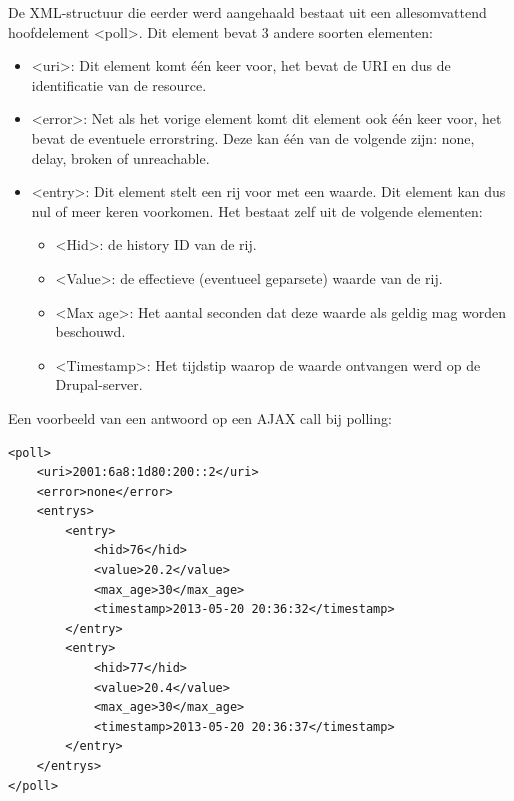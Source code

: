 De XML-structuur die eerder werd aangehaald bestaat uit een allesomvattend hoofdelement \textless poll\textgreater. Dit element bevat 3 andere soorten elementen:
\begin{itemize}
\item \textless uri\textgreater: Dit element komt \'{e}\'{e}n keer voor, het bevat de URI en dus de identificatie van de resource.
\item \textless error\textgreater: Net als het vorige element komt dit element ook \'{e}\'{e}n keer voor, het bevat de eventuele errorstring. Deze kan \'{e}\'{e}n van de volgende zijn: none, delay, broken of unreachable.
\item \textless entry\textgreater: Dit element stelt een rij voor met een waarde. Dit element kan dus nul of meer keren voorkomen. Het bestaat zelf uit de volgende elementen:
\begin{itemize}
\item \textless Hid\textgreater: de history ID van de rij.
\item \textless Value\textgreater: de effectieve (eventueel geparsete) waarde van de rij.
\item \textless Max age\textgreater: Het aantal seconden dat deze waarde als geldig mag worden beschouwd.
\item \textless Timestamp\textgreater: Het tijdstip waarop de waarde ontvangen werd op de Drupal-server.
\end{itemize}
\end{itemize}

Een voorbeeld van een antwoord op een AJAX call bij polling:

\lstset{language=XML}

\begin{lstlisting}[label=xmlPolling,caption=Voorbeeld antwoord op AJAX call bij polling]
<poll>
	<uri>2001:6a8:1d80:200::2</uri>
	<error>none</error>
	<entrys>
		<entry>
			<hid>76</hid>
			<value>20.2</value>
			<max_age>30</max_age>
			<timestamp>2013-05-20 20:36:32</timestamp>
		</entry>
		<entry>
			<hid>77</hid>
			<value>20.4</value>
			<max_age>30</max_age>
			<timestamp>2013-05-20 20:36:37</timestamp>
		</entry>
	</entrys>
</poll>
\end{lstlisting}


